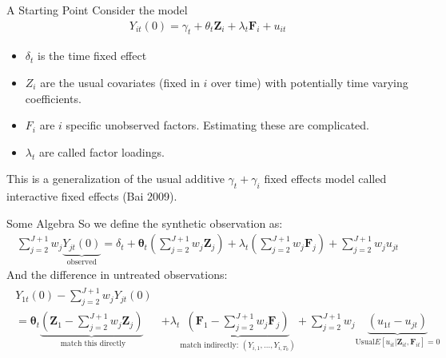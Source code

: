 \documentclass[xcolor=pdftex,dvipsnames,table,mathserif,aspectratio=169]{beamer}
\begin{document}
\begin{frame}{A Starting Point}
Consider the model
\begin{align*}
Y_{i t}(0)=\gamma_{t}+ \theta_{t} \mathbf{Z}_{i}+\lambda_{t} \mathbf{F}_{i}+u_{i t}
\end{align*}
\begin{itemize}
\item $\delta_t$ is the time fixed effect
\item $Z_i$ are the usual covariates (fixed in $i$ over time) with potentially time varying coefficients.
\item $F_i$ are $i$ specific \alert{unobserved factors}. Estimating these are complicated.
\item $\lambda_t$ are called \alert{factor loadings}.
\end{itemize}
This is a generalization of the usual additive $\gamma_t + \gamma_i$ fixed effects model called \alert{interactive fixed effects} (Bai 2009).
\end{frame}

\begin{frame}{Some Algebra}
So we define the synthetic observation as:
\begin{align*}
\sum_{j=2}^{J+1} w_{j} \underbrace{Y_{j t}(0)}_{\text{observed}}=\delta_{t}+\boldsymbol{\theta}_{t}\left(\sum_{j=2}^{J+1} w_{j} \mathbf{Z}_{j}\right)+\lambda_{t}\left(\sum_{j=2}^{J+1} w_{j} \boldsymbol{F}_{j}\right)+\sum_{j=2}^{J+1} w_{j} u_{j t}
\end{align*}
And the difference in untreated observations:
\begin{align*}
\begin{aligned}
Y_{1 t}(0)-\sum_{j=2}^{J+1} w_{j} Y_{j t}(0)\\
=\boldsymbol{\theta}_{t} \underbrace{\left( \mathbf{Z}_{1}-\sum_{j=2}^{J+1} w_{j} \mathbf{Z}_{j} \right)}_{\text{ match this directly}} 
&+\lambda_{t} \underbrace{\left(\boldsymbol{F}_{1}-\sum_{j=2}^{J+1} w_{j} \boldsymbol{F}_{j}\right)}_{\text{match indirectly:  }  (Y_{i,1},\ldots,Y_{i,T_0})}+\sum_{j=2}^{J+1} w_{j}\underbrace{\left(u_{1 t}-u_{j t}\right)}_{\text{Usual} E[u_{it} | \mathbf{Z}_{it}, \mathbf{F}_{it} ]=0}
\end{aligned}
\end{align*}
\end{frame}
\end{document}

